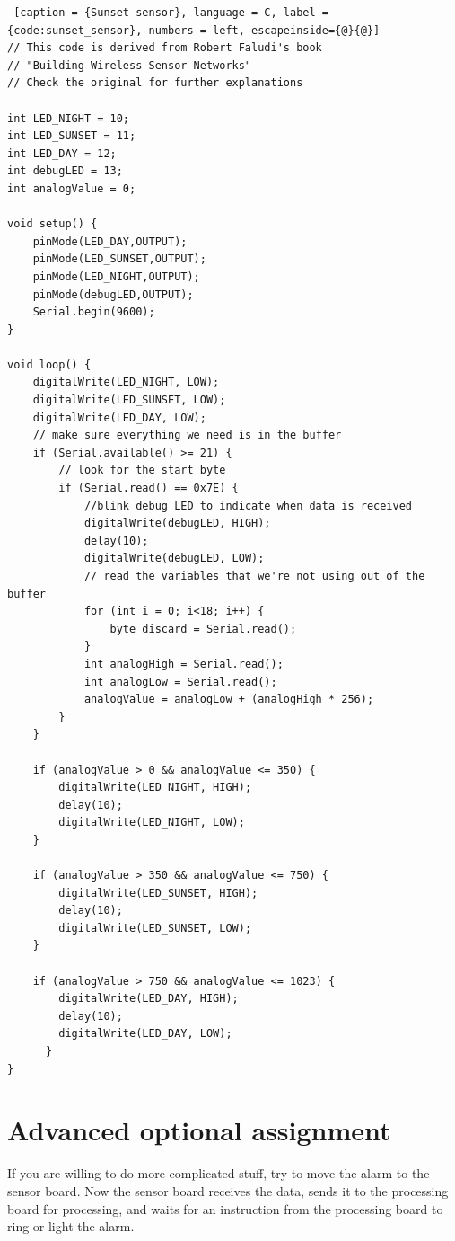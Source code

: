 \begin{lstlisting} [caption = {Sunset sensor}, language = C, label = {code:sunset_sensor}, numbers = left, escapeinside={@}{@}]
// This code is derived from Robert Faludi's book
// "Building Wireless Sensor Networks"
// Check the original for further explanations

int LED_NIGHT = 10;
int LED_SUNSET = 11;
int LED_DAY = 12;
int debugLED = 13;
int analogValue = 0;

void setup() {
    pinMode(LED_DAY,OUTPUT);
    pinMode(LED_SUNSET,OUTPUT);
    pinMode(LED_NIGHT,OUTPUT);
    pinMode(debugLED,OUTPUT);
    Serial.begin(9600);
}

void loop() {
    digitalWrite(LED_NIGHT, LOW);
    digitalWrite(LED_SUNSET, LOW);
    digitalWrite(LED_DAY, LOW);
    // make sure everything we need is in the buffer
    if (Serial.available() >= 21) {
        // look for the start byte
        if (Serial.read() == 0x7E) {
            //blink debug LED to indicate when data is received
            digitalWrite(debugLED, HIGH);
            delay(10);
            digitalWrite(debugLED, LOW);
            // read the variables that we're not using out of the buffer
            for (int i = 0; i<18; i++) {
                byte discard = Serial.read();
            }
            int analogHigh = Serial.read();
            int analogLow = Serial.read();
            analogValue = analogLow + (analogHigh * 256);
        }
    }

    if (analogValue > 0 && analogValue <= 350) {
        digitalWrite(LED_NIGHT, HIGH);
        delay(10);
        digitalWrite(LED_NIGHT, LOW);
    }

    if (analogValue > 350 && analogValue <= 750) {
        digitalWrite(LED_SUNSET, HIGH);
        delay(10);
        digitalWrite(LED_SUNSET, LOW);
    }

    if (analogValue > 750 && analogValue <= 1023) {
        digitalWrite(LED_DAY, HIGH);
        delay(10);
        digitalWrite(LED_DAY, LOW);
      }
}
\end{lstlisting}


\section{Advanced optional assignment}

If you are willing to do more complicated stuff, try to move the alarm to the sensor board. 
Now the sensor board receives the data, sends it to the processing board for processing, and waits for an instruction from the processing board to ring or light the alarm.
